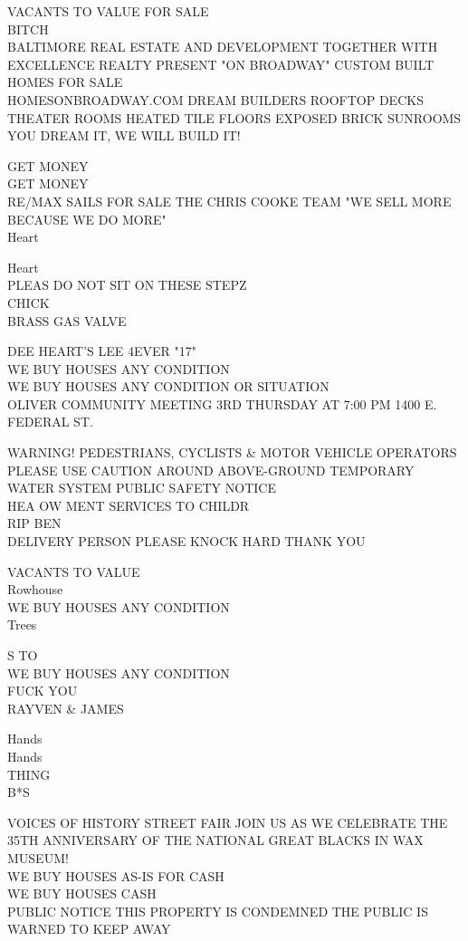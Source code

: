 \documentclass[10pt,letterpaper]{article}
\begin{document}
VACANTS TO VALUE FOR SALE\\
BITCH\\
BALTIMORE REAL ESTATE AND DEVELOPMENT TOGETHER WITH EXCELLENCE REALTY PRESENT "ON BROADWAY" CUSTOM BUILT HOMES FOR SALE\\
HOMESONBROADWAY.COM DREAM BUILDERS ROOFTOP DECKS THEATER ROOMS HEATED TILE FLOORS EXPOSED BRICK SUNROOMS YOU DREAM IT, WE WILL BUILD IT!

GET MONEY\\
GET MONEY\\
RE/MAX SAILS FOR SALE THE CHRIS COOKE TEAM "WE SELL MORE BECAUSE WE DO MORE"\\
Heart

Heart\\
PLEAS DO NOT SIT ON THESE STEPZ\\
CHICK\\
BRASS GAS VALVE

DEE HEART'S LEE 4EVER "17"\\
WE BUY HOUSES ANY CONDITION\\
WE BUY HOUSES ANY CONDITION OR SITUATION\\
OLIVER COMMUNITY MEETING 3RD THURSDAY AT 7:00 PM 1400 E. FEDERAL ST.

WARNING!  PEDESTRIANS, CYCLISTS \& MOTOR VEHICLE OPERATORS PLEASE USE CAUTION AROUND ABOVE{-}GROUND TEMPORARY WATER SYSTEM PUBLIC SAFETY NOTICE\\
HEA OW MENT SERVICES TO CHILDR\\
RIP BEN\\
DELIVERY PERSON PLEASE KNOCK HARD THANK YOU

VACANTS TO VALUE\\
Rowhouse\\
WE BUY HOUSES ANY CONDITION\\
Trees

S TO\\
WE BUY HOUSES ANY CONDITION\\
FUCK YOU\\
RAYVEN \& JAMES

Hands\\
Hands\\
THING\\
B*S

VOICES OF HISTORY STREET FAIR JOIN US AS WE CELEBRATE THE 35TH ANNIVERSARY OF THE NATIONAL GREAT BLACKS IN WAX MUSEUM!\\
WE BUY HOUSES AS{-}IS FOR CASH\\
WE BUY HOUSES CASH\\
PUBLIC NOTICE THIS PROPERTY IS CONDEMNED THE PUBLIC IS WARNED TO KEEP AWAY
\end{document}
